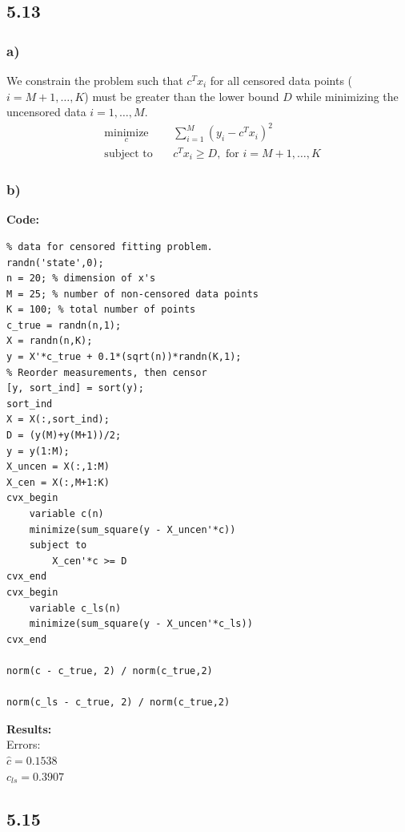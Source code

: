 \documentclass[12pt]{article}
\begin{document}
\subsection*{5.13}
\subsubsection*{a)}
We constrain the problem such that $c^Tx_i$ for all censored data points ($i=M+1,\dots,K$) must be greater than the lower bound $D$ while minimizing the uncensored data $i=1,\dots,M$.
\begin{equation*}
\begin{aligned}
& \underset{c}{\text{minimize}}
& & \sum_{i=1}^{M}(y_i-c^Tx_i)^2\\
& \text{subject to}\
& & c^Tx_i \ge D, \text{ for } i=M+1,\dots,K
\end{aligned}
\end{equation*}
\subsubsection*{b)}
\textbf{Code:}
\begin{lstlisting}
% data for censored fitting problem.
randn('state',0);
n = 20; % dimension of x's
M = 25; % number of non-censored data points
K = 100; % total number of points
c_true = randn(n,1);
X = randn(n,K);
y = X'*c_true + 0.1*(sqrt(n))*randn(K,1);
% Reorder measurements, then censor
[y, sort_ind] = sort(y);
sort_ind
X = X(:,sort_ind);
D = (y(M)+y(M+1))/2;
y = y(1:M);
X_uncen = X(:,1:M)
X_cen = X(:,M+1:K)
cvx_begin
    variable c(n)
    minimize(sum_square(y - X_uncen'*c))
    subject to
        X_cen'*c >= D
cvx_end
cvx_begin
    variable c_ls(n)
    minimize(sum_square(y - X_uncen'*c_ls))
cvx_end

norm(c - c_true, 2) / norm(c_true,2)

norm(c_ls - c_true, 2) / norm(c_true,2)
\end{lstlisting}
\textbf{Results:}\\
Errors:\\
$\hat{c} = 0.1538$\\
$c_{ls} = 0.3907$

\subsection*{5.15}
\end{document}
